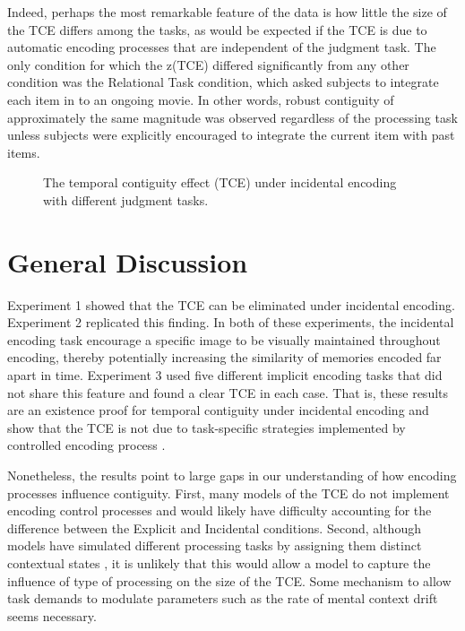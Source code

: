 \documentclass[jou,natbib]{apa6} %
\begin{document}
Indeed, perhaps the most remarkable feature of the data is how little the size of the TCE differs among the tasks, as would be expected if the TCE is due to automatic encoding processes that are independent of the judgment task. The only condition for which the z(TCE) differed significantly from any other condition was the Relational Task condition, which asked subjects to integrate each item in to an ongoing movie. In other words, robust contiguity of approximately the same magnitude was observed regardless of the processing task unless subjects were explicitly encouraged to integrate the current item with past items.

\begin{figure*}%
\caption{The temporal contiguity effect (TCE) under incidental encoding with different judgment tasks. \paneltext}
\label{E3}
\end{figure*}

\section{General Discussion}

Experiment 1 showed that the TCE can be eliminated under incidental encoding. Experiment 2 replicated this finding. In both of these experiments, the incidental encoding task encourage a specific image to be visually maintained throughout encoding, thereby potentially increasing the similarity of memories encoded far apart in time. Experiment 3 used five different implicit encoding tasks that did not share this feature and found a clear TCE in each case. That is, these results are an existence proof for temporal contiguity under incidental encoding and show that the TCE is not due to task-specific strategies implemented by controlled encoding process \citep[cf.][]{Hint16}.

Nonetheless, the results point to large gaps in our understanding of how encoding processes influence contiguity. First, many models of the TCE do not implement encoding control processes \citep[but see][]{LehmMalm13} and would likely have difficulty accounting for the difference between the Explicit and Incidental conditions. Second, although models have simulated different processing tasks by assigning them distinct contextual states \citep{PolyEtal09}, it is unlikely that this would allow a model to capture the influence of type of processing on the size of the TCE. Some mechanism to allow task demands to modulate parameters such as the rate of mental context drift seems necessary.  
\end{document}
